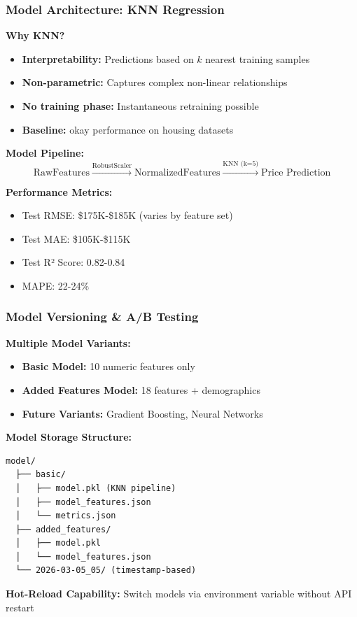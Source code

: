 \documentclass[aspectratio=169]{beamer}
\begin{document}
\begin{frame}
\frametitle{Model Architecture: KNN Regression}

\textbf{Why KNN?}
\begin{itemize}
    \item \textbf{Interpretability:} Predictions based on $k$ nearest training samples
    \item \textbf{Non-parametric:} Captures complex non-linear relationships
    \item \textbf{No training phase:} Instantaneous retraining possible
    \item \textbf{Baseline:} okay performance on housing datasets
\end{itemize}

\vspace{0.3cm}
\textbf{Model Pipeline:}
\[
\text{RawFeatures} \xrightarrow{\text{RobustScaler}} \text{NormalizedFeatures} \xrightarrow{\text{KNN (k=5)}} \text{Price Prediction}
\]

\vspace{0.3cm}
\textbf{Performance Metrics:}
\begin{itemize}
    \item Test RMSE: \$175K-\$185K (varies by feature set)
    \item Test MAE: \$105K-\$115K
    \item Test R² Score: 0.82-0.84
    \item MAPE: 22-24\%
\end{itemize}
\end{frame}

\begin{frame}[fragile]
\frametitle{Model Versioning \& A/B Testing}

\textbf{Multiple Model Variants:}
\begin{itemize}
    \item \textbf{Basic Model:} 10 numeric features only
    \item \textbf{Added Features Model:} 18 features + demographics
    \item \textbf{Future Variants:} Gradient Boosting, Neural Networks
\end{itemize}

\vspace{0.3cm}
\textbf{Model Storage Structure:}
\begin{lstlisting}
model/
  ├── basic/
  │   ├── model.pkl (KNN pipeline)
  │   ├── model_features.json
  │   └── metrics.json
  ├── added_features/
  │   ├── model.pkl
  │   └── model_features.json
  └── 2026-03-05_05/ (timestamp-based)
\end{lstlisting}

\textbf{Hot-Reload Capability:} Switch models via environment variable without API restart
\end{frame}
\end{document}
